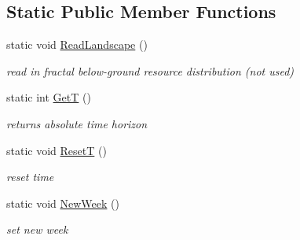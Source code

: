 \subsection*{Static Public Member Functions}
\begin{DoxyCompactItemize}
\item 
static void \mbox{\hyperlink{class_c_envir_a40fc9c5737af9c6c7e073009a64c498f}{Read\+Landscape}} ()
\begin{DoxyCompactList}\small\item\em read in fractal below-\/ground resource distribution (not used) \end{DoxyCompactList}\item 
\mbox{\label{class_c_envir_ad1cd925ddd41b53753c740fbfe58c0b1}} 
static int \mbox{\hyperlink{class_c_envir_ad1cd925ddd41b53753c740fbfe58c0b1}{GetT}} ()
\begin{DoxyCompactList}\small\item\em returns absolute time horizon \end{DoxyCompactList}\item 
\mbox{\label{class_c_envir_a79f12aff0ce709cd4ec67a8e0ef38300}} 
static void \mbox{\hyperlink{class_c_envir_a79f12aff0ce709cd4ec67a8e0ef38300}{ResetT}} ()
\begin{DoxyCompactList}\small\item\em reset time \end{DoxyCompactList}\item 
\mbox{\label{class_c_envir_ae78fbaa4dc8592dc3a833c7f83cc2ff6}} 
static void \mbox{\hyperlink{class_c_envir_ae78fbaa4dc8592dc3a833c7f83cc2ff6}{New\+Week}} ()
\begin{DoxyCompactList}\small\item\em set new week \end{DoxyCompactList}\end{DoxyCompactItemize}
